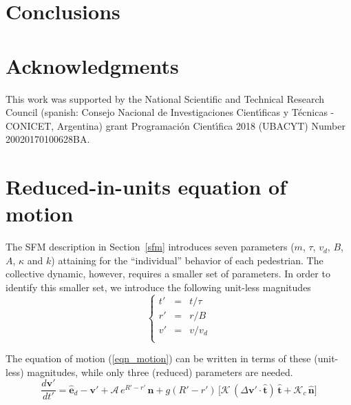 \documentclass[preprint,12pt]{elsarticle}
\begin{document}
\section{\label{conclusions}Conclusions}

\section*{Acknowledgments}
This work was supported by the National Scientific and Technical 
Research Council (spanish: Consejo Nacional de Investigaciones Cient\'\i ficas 
y T\'ecnicas - CONICET, Argentina) grant Programaci\'on Cient\'\i fica 2018 (UBACYT) Number 20020170100628BA.

\appendix

\section{\label{appendix1}Reduced-in-units equation of motion}

The SFM description in Section~\ref{sfm} introduces seven parameters ($m$, 
$\tau$, $v_d$, $B$, $A$, $\kappa$ and $k$) attaining for the ``individual'' 
behavior of each pedestrian. The collective dynamic, however, requires a 
smaller set of parameters. In order to identify this smaller set, we introduce 
the following unit-less magnitudes\\

\begin{equation}
 \left\{\begin{array}{lcl}
         t' & = & t/\tau \\
         r' & = & r/B \\
         v' & = & v/v_d \\
        \end{array}\right.
\end{equation}

The equation of motion (\ref{eqn_motion}) can be written in terms of these 
(unit-less) magnitudes, while only three (reduced) parameters are needed.\\


\begin{equation}
 \displaystyle\frac{d\mathbf{v}'}{dt'}=
 \hat{\mathbf{e}}_d-\mathbf{v}'+\mathcal{A}\,e^{R'-r'}\,
 \hat{\mathbf{n}}+g(R'-r')\,\bigg[\mathcal{K}\,(\Delta\mathbf{v}'\cdot
 \hat{\mathbf{t}})\,\hat{\mathbf{t}}+\mathcal{K}_c\,\hat{\mathbf{n}}\bigg]
\end{equation}
\end{document}
